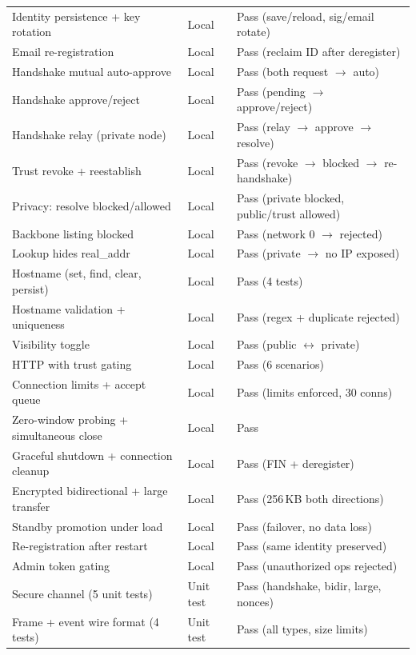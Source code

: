\documentclass[11pt,a4paper]{article}
\begin{document}
\begin{longtable}{@{}p{}p{}p{}@{}}
Identity persistence + key rotation & Local & Pass (save/reload, sig/email rotate) \\
Email re-registration & Local & Pass (reclaim ID after deregister) \\
\midrule
Handshake mutual auto-approve & Local & Pass (both request $\rightarrow$ auto) \\
Handshake approve/reject & Local & Pass (pending $\rightarrow$ approve/reject) \\
Handshake relay (private node) & Local & Pass (relay $\rightarrow$ approve $\rightarrow$ resolve) \\
Trust revoke + reestablish & Local & Pass (revoke $\rightarrow$ blocked $\rightarrow$ re-handshake) \\
Privacy: resolve blocked/allowed & Local & Pass (private blocked, public/trust allowed) \\
Backbone listing blocked & Local & Pass (network 0 $\rightarrow$ rejected) \\
Lookup hides real\_addr & Local & Pass (private $\rightarrow$ no IP exposed) \\
\midrule
Hostname (set, find, clear, persist) & Local & Pass (4 tests) \\
Hostname validation + uniqueness & Local & Pass (regex + duplicate rejected) \\
Visibility toggle & Local & Pass (public $\leftrightarrow$ private) \\
HTTP with trust gating & Local & Pass (6 scenarios) \\
Connection limits + accept queue & Local & Pass (limits enforced, 30 conns) \\
Zero-window probing + simultaneous close & Local & Pass \\
Graceful shutdown + connection cleanup & Local & Pass (FIN + deregister) \\
\midrule
Encrypted bidirectional + large transfer & Local & Pass (256\,KB both directions) \\
Standby promotion under load & Local & Pass (failover, no data loss) \\
Re-registration after restart & Local & Pass (same identity preserved) \\
Admin token gating & Local & Pass (unauthorized ops rejected) \\
Secure channel (5 unit tests) & Unit test & Pass (handshake, bidir, large, nonces) \\
Frame + event wire format (4 tests) & Unit test & Pass (all types, size limits) \\

\end{longtable}
\end{document}
